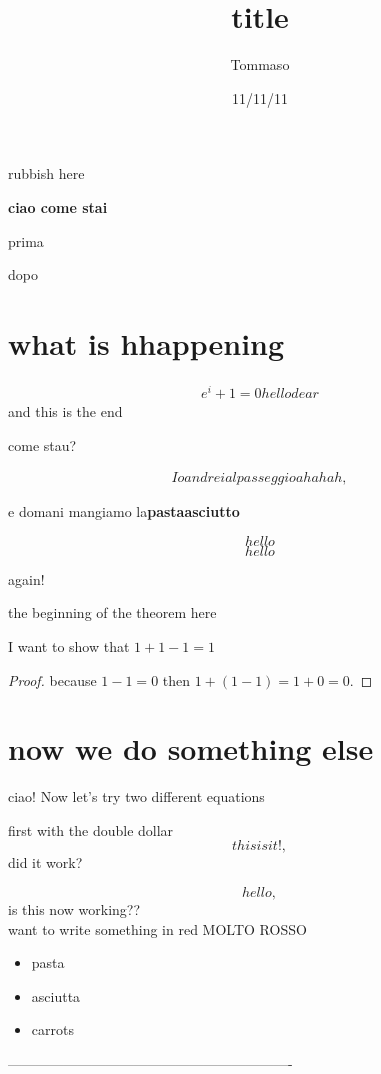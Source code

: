 
\some rubbish here


\title{title } \author{Tommaso}


\date{11/11/11}
\textbf{ciao come stai}

prima

dopo

\section{what is hhappening}

\begin{align*}
e^i+1=0 hello dear
\end{align*}
and this is the end

come stau?

\begin{align}
Io andrei al passeggio ahahah,
\end{align}

e domani mangiamo la\textbf{pastaasciutto}

\begin{equation} hello \end{equation}
\begin{equation*} hello \end{equation*}

again! \centering

the beginning of the theorem {\Large here}
\begin{theorem}
I want to show that $1+1-1 = 1$
\end{theorem}
\begin{proof}
because $1-1=0$ then $1+(1-1)=1+0=0.$
\end{proof}

\section*{now we do something else}

ciao! Now let's try {\small two different equations}

first with the double dollar
$$
this is it!,
$$
did it work?

\[ hello, \] is this now working?? \\ want to write something in red {\color{red} MOLTO ROSSO }

\begin{itemize}

\item pasta
\item asciutta

\item carrots
\end{itemize}

-------------------------------------------------------------





